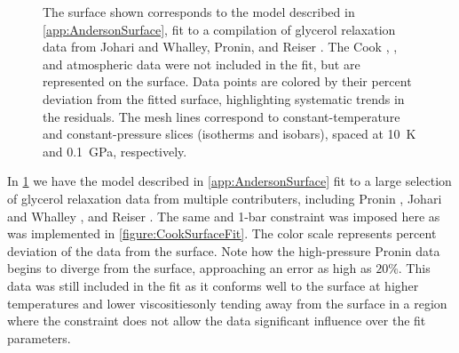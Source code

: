 \begin{figure}[!htbp]
{
	}
	\caption{The surface shown corresponds to the model described in \app\nolinebreak\ref{app:AndersonSurface}, fit to a compilation of glycerol relaxation data from Johari and Whalley, Pronin, and Reiser \etal. The Cook \etal, \tgp, and atmospheric data were not included in the fit, but are represented on the surface. Data points are colored by their percent deviation from the fitted surface, highlighting systematic trends in the residuals. The mesh lines correspond to constant-temperature and constant-pressure slices (isotherms and isobars), spaced at 10~K and 0.1~GPa, respectively.}
	\label{figure:GlycerolSurfaceFitWithError}
	
\end{figure} 

In \fig \ref{figure:GlycerolSurfaceFitWithError} we have the model described in \app\nolinebreak \ref{app:AndersonSurface} fit to a large selection of glycerol relaxation data from multiple contributers, including Pronin \etal \cite{Pronin}, Johari and Whalley \cite{JohariWhalley}, and Reiser \etal \cite{Reiser}.  The same \tgp and 1-bar constraint was imposed here as was implemented in \fig\nolinebreak \ref{figure:CookSurfaceFit}.  The color scale represents percent deviation of the data from the surface.  Note how the high-pressure Pronin data begins to diverge from the surface, approaching an error as high as $20\%$.  This data was still included in the fit as it conforms well to the surface at higher temperatures and lower viscosities\textemdash only tending away from the surface in a region where the \tgp constraint does not allow the data significant influence over the fit parameters.

